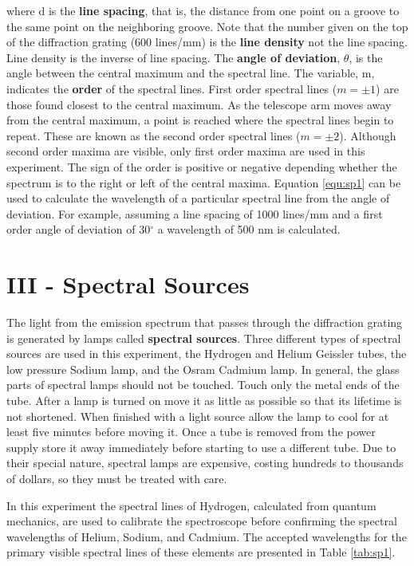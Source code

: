\noindent where d is the {\bf line spacing}, that is, the distance from one point on a groove to the same point on the neighboring groove. Note that the number given on the top of the diffraction grating (600 lines/mm) is the {\bf line density} not the line spacing. Line density is the inverse of line spacing. The {\bf angle of deviation}, $\theta$, is the angle between the central maximum and the spectral line. The variable, m, indicates the {\bf order} of the spectral lines. First order spectral lines ($m=\pm1$) are those found closest to the central maximum. As the telescope arm moves away from the central maximum, a point is reached where the spectral lines begin to repeat. These are known as the second order spectral lines ($m=\pm2$). Although second order maxima are visible, only first order maxima are used in this experiment. The sign of the order is positive or negative depending whether the spectrum is to the right or left of the central maxima. Equation \ref{equ:sp1} can be used to calculate the wavelength of a particular spectral line from the angle of deviation. For example, assuming a line spacing of 1000 lines/mm and a first order angle of deviation of 30$^{\circ}$ a wavelength of 500 nm is calculated.

\section{III - Spectral Sources}
The light from the emission spectrum that passes through the diffraction grating is generated by lamps called {\bf spectral sources}. Three different types of spectral sources are used in this experiment, the Hydrogen and Helium Geissler tubes, the low pressure Sodium lamp, and the Osram Cadmium lamp. In general, the glass parts of spectral lamps should not be touched. Touch only the metal ends of the tube. After a lamp is turned on move it as little as possible so that its lifetime is not shortened. When finished with a light source allow the lamp to cool for at least five minutes before moving it. Once a tube is removed from the power supply store it away immediately before starting to use a different tube. Due to their special nature, spectral lamps are expensive, costing hundreds to thousands of dollars, so they must be treated with care.

In this experiment the spectral lines of Hydrogen, calculated from quantum mechanics, are used to calibrate the spectroscope before confirming the spectral wavelengths of Helium, Sodium, and Cadmium. The accepted wavelengths for the primary visible spectral lines of these elements are presented in Table \ref{tab:sp1}.

